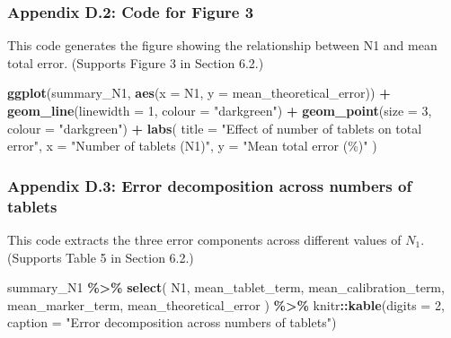 \documentclass[
  12pt,
]{article}
\newenvironment{Shaded}{\begin{snugshade}}{\end{snugshade}}
\newcommand{\AttributeTok}[1]{\textcolor[rgb]{0.13,0.29,0.53}{#1}}
\newcommand{\DecValTok}[1]{\textcolor[rgb]{0.00,0.00,0.81}{#1}}
\newcommand{\FunctionTok}[1]{\textcolor[rgb]{0.13,0.29,0.53}{\textbf{#1}}}
\newcommand{\NormalTok}[1]{#1}
\newcommand{\SpecialCharTok}[1]{\textcolor[rgb]{0.81,0.36,0.00}{\textbf{#1}}}
\newcommand{\StringTok}[1]{\textcolor[rgb]{0.31,0.60,0.02}{#1}}
\begin{document}
\subsubsection{Appendix D.2: Code for Figure
3}\label{appendix-d.2-code-for-figure-3}

This code generates the figure showing the relationship between N1 and
mean total error. (Supports Figure 3 in Section 6.2.)

\begin{Shaded}
\begin{Highlighting}[]
\FunctionTok{ggplot}\NormalTok{(summary\_N1, }\FunctionTok{aes}\NormalTok{(}\AttributeTok{x =}\NormalTok{ N1, }\AttributeTok{y =}\NormalTok{ mean\_theoretical\_error)) }\SpecialCharTok{+}
  \FunctionTok{geom\_line}\NormalTok{(}\AttributeTok{linewidth =} \DecValTok{1}\NormalTok{, }\AttributeTok{colour =} \StringTok{"darkgreen"}\NormalTok{) }\SpecialCharTok{+}
  \FunctionTok{geom\_point}\NormalTok{(}\AttributeTok{size =} \DecValTok{3}\NormalTok{, }\AttributeTok{colour =} \StringTok{"darkgreen"}\NormalTok{) }\SpecialCharTok{+}
  \FunctionTok{labs}\NormalTok{(}
    \AttributeTok{title =} \StringTok{"Effect of number of tablets on total error"}\NormalTok{,}
    \AttributeTok{x =} \StringTok{"Number of tablets (N1)"}\NormalTok{,}
    \AttributeTok{y =} \StringTok{"Mean total error (\%)"}
\NormalTok{  )}
\end{Highlighting}
\end{Shaded}

\subsubsection{Appendix D.3: Error decomposition across numbers of
tablets}\label{appendix-d.3-error-decomposition-across-numbers-of-tablets}

This code extracts the three error components across different values of
\(N_1\). (Supports Table 5 in Section 6.2.)

\begin{Shaded}
\begin{Highlighting}[]
\NormalTok{summary\_N1 }\SpecialCharTok{\%\textgreater{}\%}
  \FunctionTok{select}\NormalTok{(}
\NormalTok{    N1,}
\NormalTok{    mean\_tablet\_term,}
\NormalTok{    mean\_calibration\_term,}
\NormalTok{    mean\_marker\_term,}
\NormalTok{    mean\_theoretical\_error}
\NormalTok{  ) }\SpecialCharTok{\%\textgreater{}\%}
\NormalTok{  knitr}\SpecialCharTok{::}\FunctionTok{kable}\NormalTok{(}\AttributeTok{digits =} \DecValTok{2}\NormalTok{, }\AttributeTok{caption =} \StringTok{"Error decomposition across numbers of tablets"}\NormalTok{)}
\end{Highlighting}
\end{Shaded}
\end{document}
